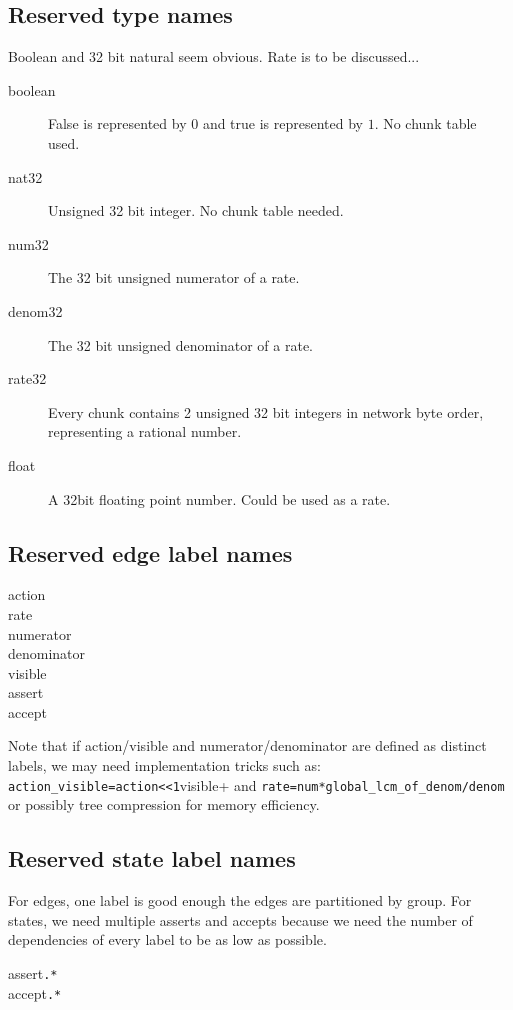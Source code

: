\subsection{Reserved type names}

Boolean and 32 bit natural seem obvious. Rate is to be discussed...
\begin{description}
\item[boolean] False is represented by $0$ and true is represented by $1$. No chunk table used.
\item[nat32] Unsigned 32 bit integer. No chunk table needed.
\item[num32] The 32 bit unsigned numerator of a rate.
\item[denom32] The 32 bit unsigned denominator of a rate.
\item[rate32] Every chunk contains 2 unsigned 32 bit integers in network byte order, representing a rational number.
\item[float] A 32bit floating point number. Could be used as a rate.
\end{description}

\subsection{Reserved edge label names}

\begin{description}
\item[action]
\item[rate]
\item[numerator] 
\item[denominator]
\item[visible]
\item[assert]
\item[accept]
\end{description}

Note that if action/visible and numerator/denominator are defined as distinct labels,
we may need implementation tricks such as: \verb+action_visible=action<<1+visible+
and \verb+rate=num*global_lcm_of_denom/denom+ or possibly tree compression for memory efficiency.

\subsection{Reserved state label names}

For edges, one label is good enough the edges are partitioned by group.
For states, we need multiple asserts and accepts because we need the number of dependencies
of every label to be as low as possible.

\begin{description}
\item[assert{\tt .*}] 
\item[accept{\tt .*}] 
\end{description}




